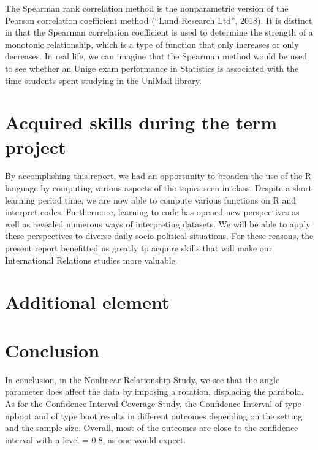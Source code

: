 \documentclass[11pt,]{article}
\begin{document}
The Spearman rank correlation method is the nonparametric version of the
Pearson correlation coefficient method (``Lund Research Ltd'', 2018). It
is distinct in that the Spearman correlation coefficient is used to
determine the strength of a monotonic relationship, which is a type of
function that only increases or only decreases. In real life, we can
imagine that the Spearman method would be used to see whether an Unige
exam performance in Statistics is associated with the time students
spent studying in the UniMail library.

\hypertarget{acquired-skills-during-the-term-project}{%
\section{Acquired skills during the term
project}\label{acquired-skills-during-the-term-project}}

By accomplishing this report, we had an opportunity to broaden the use
of the R language by computing various aspects of the topics seen in
class. Despite a short learning period time, we are now able to compute
various functions on R and interpret codes. Furthermore, learning to
code has opened new perspectives as well as revealed numerous ways of
interpreting datasets. We will be able to apply these perspectives to
diverse daily socio-political situations. For these reasons, the present
report benefitted us greatly to acquire skills that will make our
International Relations studies more valuable.

\hypertarget{additional-element}{%
\section{Additional element}\label{additional-element}}

\hypertarget{conclusion}{%
\section{Conclusion}\label{conclusion}}

In conclusion, in the Nonlinear Relationship Study, we see that the
angle parameter does affect the data by imposing a rotation, displacing
the parabola. As for the Confidence Interval Coverage Study, the
Confidence Interval of type npboot and of type boot results in different
outcomes depending on the setting and the sample size. Overall, most of
the outcomes are close to the confidence interval with a level = 0.8, as
one would expect.
\end{document}
